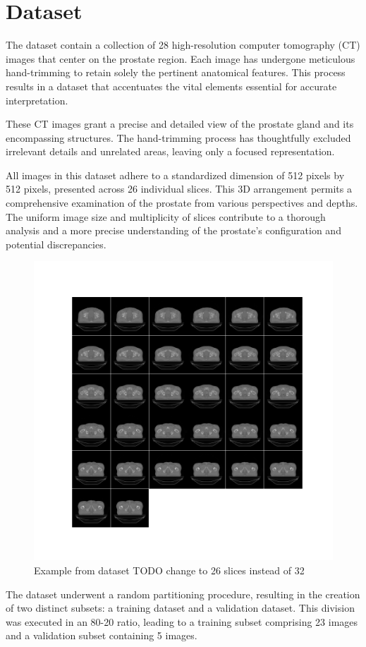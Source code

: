 \documentclass[11pt,a4paper]{report}
\begin{document}
\section{Dataset}
The dataset contain a collection of 28 high-resolution computer tomography (CT) images that center on the prostate region. Each image has undergone meticulous hand-trimming to retain solely the pertinent anatomical features. This process results in a dataset that accentuates the vital elements essential for accurate interpretation.

These CT images grant a precise and detailed view of the prostate gland and its encompassing structures. The hand-trimming process has thoughtfully excluded irrelevant details and unrelated areas, leaving only a focused representation.

All images in this dataset adhere to a standardized dimension of 512 pixels by 512 pixels, presented across 26 individual slices. This 3D arrangement permits a comprehensive examination of the prostate from various perspectives and depths. The uniform image size and multiplicity of slices contribute to a thorough analysis and a more precise understanding of the prostate's configuration and potential discrepancies.

\begin{figure}[H]
	\centering
	\includegraphics[scale=0.55]{images/datasetExample}
    \caption{Example from dataset TODO change to 26 slices instead of 32}
\end{figure}
The dataset underwent a random partitioning procedure, resulting in the creation of two distinct subsets: a training dataset and a validation dataset. This division was executed in an 80-20 ratio, leading to a training subset comprising 23 images and a validation subset containing 5 images.
\end{document}
